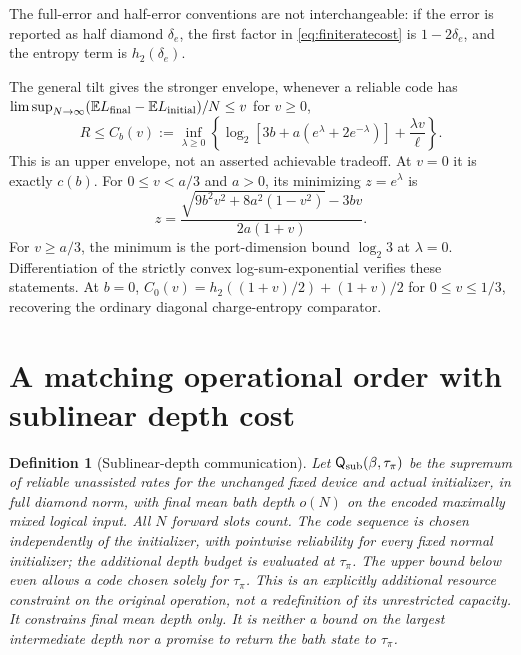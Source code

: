 \documentclass[11pt]{article}
\newtheorem{definition}[theorem]{Definition}
\newcommand{\E}{\mathbb E}
\newcommand{\Qcap}{\mathsf Q}
\begin{document}
The full-error and half-error conventions are not interchangeable:
if the error is reported as half diamond \(\delta_e\), the first factor
in \eqref{eq:finiteratecost} is \(1-2\delta_e\), and the entropy term is
\(h_2(\delta_e)\).

The general tilt gives the stronger envelope, whenever a reliable code
has \(\limsup_{N\to\infty}(\E L_{\rm final}-\E L_{\rm initial})/N
\le v\) for \(v\ge0\),
\begin{equation}\label{eq:costcurve}
 R\le C_b(v):=\inf_{\lambda\ge0}
 \left\{\log_2[3b+a(e^\lambda+2e^{-\lambda})]
             +\frac{\lambda v}{\ell}\right\}.
\end{equation}
This is an upper envelope, not an asserted achievable tradeoff.
At \(v=0\) it is exactly \(c(b)\).
For \(0\le v<a/3\) and \(a>0\), its minimizing \(z=e^\lambda\) is
\[
 z=\frac{\sqrt{9b^2v^2+8a^2(1-v^2)}-3bv}{2a(1+v)}.
\]
For \(v\ge a/3\), the minimum is the port-dimension bound \(\log_2 3\)
at \(\lambda=0\). Differentiation of the strictly convex
log-sum-exponential verifies these statements. At \(b=0\),
\(C_0(v)=h_2((1+v)/2)+(1+v)/2\) for \(0\le v\le1/3\),
recovering the ordinary diagonal charge-entropy comparator.

\section{A matching operational order with sublinear depth cost}

\begin{definition}[Sublinear-depth communication]
Let \(\Qcap_{\rm sub}(\beta,\tau_\pi)\) be the supremum of reliable
unassisted rates for the unchanged fixed device and actual initializer,
in full diamond norm, with final mean bath depth \(o(N)\) on the encoded
maximally mixed logical input. All \(N\) forward slots count.
The code sequence is chosen independently of the initializer, with
pointwise reliability for every fixed normal initializer; the additional
depth budget is evaluated at \(\tau_\pi\). The upper bound below even
allows a code chosen solely for \(\tau_\pi\).
This is an explicitly additional resource constraint on the original
operation, not a redefinition of its unrestricted capacity.
It constrains final mean depth only. It is neither a bound on the largest
intermediate depth nor a promise to return the bath state to \(\tau_\pi\).
\end{definition}
\end{document}

